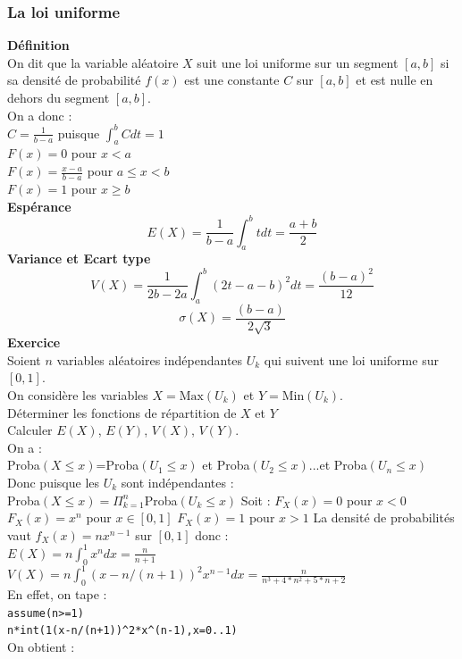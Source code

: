 \documentclass[a4paper,11pt]{book}
\begin{document}
\subsubsection{La loi uniforme}
{\bf D\'efinition}\\
On dit que la variable al\'eatoire $X$ suit une loi uniforme sur un segment 
$[a,b]$ si sa densit\'e de probabilit\'e $f(x)$ est une constante $C$ sur  
$[a,b]$ et est nulle en dehors du segment $[a,b]$.\\
On a donc :\\
$\displaystyle C=\frac{1}{b-a}$ puisque $\displaystyle \int_a^bCdt=1$\\
$F(x)=0$ pour $x<a$\\
$\displaystyle F(x)=\frac{x-a}{b-a}$ pour $a\leq x<b$\\
$F(x)=1$ pour $x\geq b$\\
{\bf Esp\'erance}
$$E(X)=\frac{1}{b-a}\int_a^btdt=\frac{a+b}{2}$$
{\bf Variance et Ecart type}
$$V(X)=\frac{1}{2b-2a}\int_a^b(2t-a-b)^2dt=\frac{(b-a)^2}{12}$$
$$\sigma(X)=\frac{(b-a)}{2\sqrt 3}$$
{\bf Exercice}\\
Soient $n$ variables al\'eatoires ind\'ependantes $U_k$ qui suivent une loi 
uniforme sur $[0,1]$.\\
On consid\`ere les variables $X=\mbox{Max}(U_k)$ et $Y=\mbox{Min}(U_k)$.\\
D\'eterminer les fonctions de r\'epartition de $X$ et $Y$\\
Calculer $E(X)$, $E(Y)$, $V(X)$, $V(Y)$.\\
On a :\\
Proba$(X\leq x)$=Proba$(U_1\leq x)$ et Proba$(U_2\leq x)$...et Proba$(U_n\leq x)$\\
Donc puisque les  $U_k$ sont ind\'ependantes :\\
Proba$(X\leq x)=\Pi_{k=1}^n$Proba$(U_k\leq x)$
Soit :
$F_X(x)=0$ pour $x<0$\\
$F_X(x)=x^n$ pour $x\in [0,1]$
$F_X(x)=1$ pour $x>1$
La densit\'e de probabilit\'es vaut $f_X(x)=nx^{n-1}$ sur $[0,1]$ donc :\\
$\displaystyle E(X)=n\int_0^1x^ndx=\frac{n}{n+1}$\\
$\displaystyle V(X)=n\int_0^1(x-n/(n+1))^2x^{n-1}dx=\frac{n}{n^3+4*n^2+5*n+2}$\\
En effet, on tape :\\
{\tt assume(n>=1)}\\
{\tt n*int(1(x-n/(n+1))\verb|^|2*x\verb|^|(n-1),x=0..1)}\\
On obtient :\\
\end{document}
